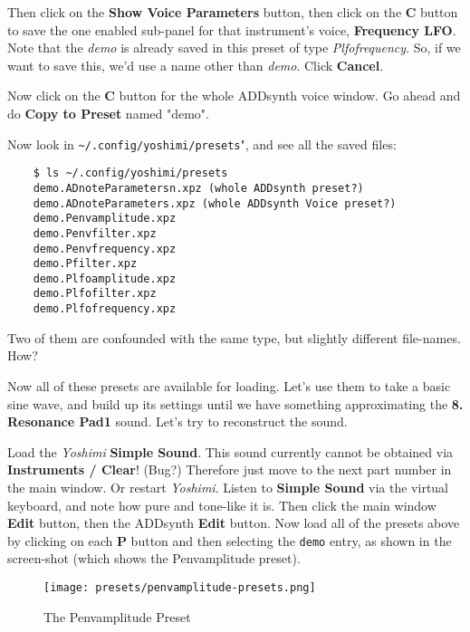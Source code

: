    Then click on the \textbf{Show Voice Parameters} button,
   then click on the \textbf{C} button to save the one enabled sub-panel
   for that instrument's voice, \textbf{Frequency LFO}.
   Note that the \textsl{demo} is already saved in this preset of
   type \textsl{Plfofrequency}.  So, if we want to save this, we'd use a
   name other than \textsl{demo}.  Click \textbf{Cancel}.

   Now click on the \textbf{C} button
   for the whole ADDsynth voice window.  Go ahead and do
   \textbf{Copy to Preset} named "demo".

   Now look in \texttt{\textasciitilde/.config/yoshimi/presets}",
   and see all the saved files:

\begin{verbatim}
	$ ls ~/.config/yoshimi/presets
	demo.ADnoteParametersn.xpz (whole ADDsynth preset?)
	demo.ADnoteParameters.xpz (whole ADDsynth Voice preset?)
	demo.Penvamplitude.xpz
	demo.Penvfilter.xpz
	demo.Penvfrequency.xpz
	demo.Pfilter.xpz
	demo.Plfoamplitude.xpz
	demo.Plfofilter.xpz
	demo.Plfofrequency.xpz
\end{verbatim}

	Two of them are confounded with the same type, but slightly
   different file-names.  How?

   Now all of these presets are available for loading.
   Let's use them to take a basic sine wave, and build up its settings until
   we have something approximating the \textbf{8. Resonance Pad1} sound.
   Let's try to reconstruct the sound.
   
   Load the \textsl{Yoshimi} \textbf{Simple Sound}. 
   This sound currently cannot be obtained via \textbf{Instruments / Clear}!
   (Bug?)
   Therefore just move to the next part number in the main window.
   Or restart \textsl{Yoshimi}.
   Listen to \textbf{Simple Sound} via the virtual keyboard, and note
   how pure and tone-like it is.
   Then click the main window \textbf{Edit} button, then the
   ADDsynth \textbf{Edit} button.
   Now load all of the presets above by clicking on each \textbf{P}
   button and then selecting the \texttt{demo} entry, 
   as shown in the screen-shot (which shows the Penvamplitude preset).

\begin{figure}[H]
   \centering 
   \texttt{[image: presets/penvamplitude-presets.png]}
   \caption{The Penvamplitude Preset}
   \label{fig:presets_penvamplitude}
\end{figure}

